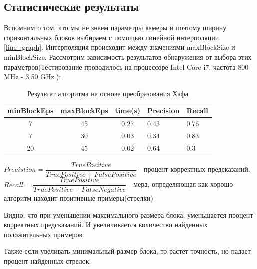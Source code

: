 \newpage
\subsection{Статистические результаты}
Вспомним о том, что мы не знаем параметры камеры и поэтому ширину горизонтальных блоков выбираем с помощью линейной интерполяции \ref{line_graph}. Интерполяция происходит между значениями maxBlockSize и minBlockSize. 
Рассмотрим зависимость результатов обнаружения от выбора этих параметров(Тестирование проводилось на процессоре Intel Core i7, частота 800 MHz - 3.50 GHz.):
\begin{table}[!h]
	\caption{Результат алгоритма на основе преобразования Хафа}
	\begin{tabular}{|c|c|c|l|l|}
		\hline
		\multicolumn{1}{|l|}{\textbf{minBlockEps}} & \multicolumn{1}{l|}{\textbf{maxBlockEps}} & \multicolumn{1}{l|}{\textbf{time(s)}} & \textbf{Precision} & \textbf{Recall} \\ \hline
		7                                          & 45                                        & 0.27                                   & 0.43               & 0.76            \\ \hline
		7                                          & 30                                        & 0.03                                   & 0.34                & 0.83            \\ \hline
		20                                         & 45                                        & 0.02                                  & 0.64               & 0.3             \\ \hline
	\end{tabular}
	\label{Tab:res_hough}
\end{table}
\newline
$Precistion = \dfrac{TruePositive}{TruePositive + FalsePositive}$ - процент корректных предсказаний.
\newline
$Recall = \dfrac{TruePositive}{TruePositive + FalseNegative}$ - мера, определяющая как хорошо алгоритм находит позитивные примеры(стрелки)

Видно, что при уменьшении максимального размера блока, уменьшается процент корректных предсказаний. И увеличивается количество найденных положительных примеров. 

Также если увеливать минимальный размер блока, то растет точность, но падает процент найденных стрелок.

